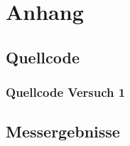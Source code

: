 \documentclass[TGAI_Laborbericht.tex]{subfiles}
\begin{document}
\chapter*{Anhang}
\label{chap:APPENDIX}
\addtocounter{chapter}{1}
\setcounter{section}{0}

\section{Quellcode}
\label{chap:APPENDIX_SOURCECODE}

\subsection{Quellcode Versuch 1}
\label{chap:APPENDIX_SOURCECODE_V1}



\section{Messergebnisse}
\label{chap:APPENDIX_MEASUREMENT_SOURCE}


%
%

\clearpage
\end{document}
